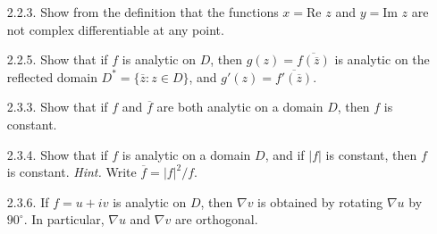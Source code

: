 \documentclass[9pt]{article}
\begin{document}
\begin{enumerate}
   \item[2.2.3.]  Show from the definition that the functions $x = \text{Re }z$
                  and $y = \text{Im }z$ are not complex differentiable at any 
                  point.
   \item[2.2.5.]  Show that if $f$ is analytic on $D$, then
                  $g(z) = \overline{f(\overline{z})}$ is analytic on the
                  reflected domain $D^* = \{\overline{z} : z \in D\}$, and
                  $g'(z) = \overline{f'(\overline{z})}$.
   \item[2.3.3.]  Show that if $f$ and $\overline{f}$ are both analytic on a
                  domain $D$, then $f$ is constant.
   \item[2.3.4.]  Show that if $f$ is analytic on a domain $D$, and if $|f|$ is
                  constant, then $f$ is constant. \textit{Hint.} Write
                  $\overline{f} = |f|^2/f$.
   \item[2.3.6.]  If $f = u + iv$ is analytic on $D$, then $\nabla v$ is
                  obtained by rotating $\nabla u$ by $90^\circ$. In particular,
                  $\nabla u$ and $\nabla v$ are orthogonal.
\end{enumerate}
\end{document}
